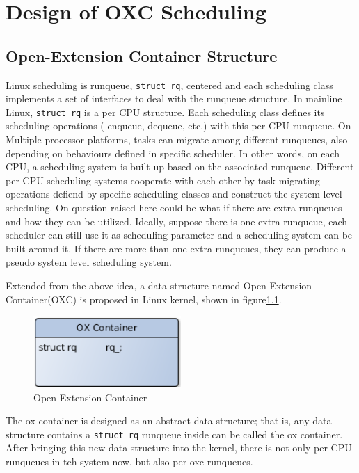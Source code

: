 \chapter{Design of OXC Scheduling\label{chap:design}}

\section{Open-Extension Container Structure\label{sec:design_oxc}}
Linux scheduling is runqueue, \texttt{struct rq}, centered and each 
scheduling class implements a set of interfaces to deal with the 
runqueue structure. In mainline Linux, \texttt{struct rq} is a per CPU 
structure. Each scheduling class defines its scheduling operations (
enqueue, dequeue, etc.) with this per CPU runqueue. On Multiple processor
platforms, tasks can migrate among different runqueues, also depending
on behaviours defined in specific scheduler. In other words, on each CPU, 
a scheduling system is built up based on the associated runqueue.
Different per CPU scheduling systems cooperate with each other by task 
migrating operations defiend by specific scheduling classes and construct 
the system level scheduling. On question raised here could be what if there
are extra runqueues and how they can be utilized. Ideally, suppose there is 
one extra runqueue, each scheduler can still use it as scheduling parameter 
and a scheduling system can be built around it. If there are more than one 
extra runqueues, they can produce a pseudo system level scheduling system.   

Extended from the above idea, a data structure named Open-Extension 
Container(OXC) is proposed in Linux kernel, shown in figure\ref{fig:oxc}.
\begin{figure}[htbp]
        \centering
        \includegraphics[width=0.5\textwidth]{images/oxc}
        \caption{Open-Extension Container}
        \label{fig:oxc}
\end{figure}
The ox container is designed as an abstract data structure; that is, any data
structure contains a \texttt{struct rq} runqueue inside can be called the ox
container. After bringing this new data structure into the kernel, there is 
not only per CPU runqueues in teh system now, but also per oxc runqueues.

